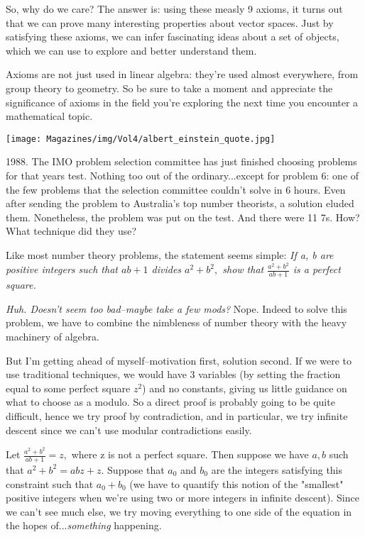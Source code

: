 \documentclass{article}
\begin{document}
\begin{multicols}{3}
So, why do we care? The answer is: using these measly 9 axioms, it turns out that we can prove many interesting properties about vector spaces. Just by satisfying these axioms, we can infer fascinating ideas about a set of objects, which we can use to explore and better understand them.

Axioms are not just used in linear algebra: they're used almost everywhere, from group theory to geometry. So be sure to take a moment and appreciate the significance of axioms in the field you're exploring the next time you encounter a mathematical topic.

\begin{center}
\texttt{[image: Magazines/img/Vol4/albert\_einstein\_quote.jpg]}
\end{center}
\closearticle

1988. The IMO problem selection committee has just finished choosing problems for that years test. Nothing too out of the ordinary...except for problem 6: one of the few problems that the selection committee couldn't solve in 6 hours. Even after sending the problem to Australia's top number theorists, a solution eluded them. Nonetheless, the problem was put on the test. And there were 11 7s. How? What technique did they use?

Like most number theory problems, the statement seems simple: \textit{If a, b are positive integers such that $ab+1 $ divides $a^2+b^2,$ show that $\frac{a^2+b^2}{ab+1}$ is a perfect square.} 

\textit{Huh. Doesn't seem too bad--maybe take a few mods?} Nope. Indeed to solve this problem, we have to combine the nimbleness of number theory with the heavy machinery of algebra. 

But I'm getting ahead of myself--motivation first, solution second. If we were to use traditional techniques, we would have 3 variables (by setting the fraction equal to some perfect square $z^2$) and no constants, giving us little guidance on what to choose as a modulo. So a direct proof is probably going to be quite difficult, hence we try proof by contradiction, and in particular, we try infinite descent since we can't use modular contradictions easily.

Let $\frac{a^2+b^2}{ab+1}=z,$ where z is not a perfect square. Then suppose we have $a,b$ such that $a^2+b^2=abz+z.$ Suppose that $a_0$ and $b_0$ are the integers satisfying this constraint such that $a_0+b_0$ (we have to quantify this notion of the "smallest" positive integers when we're using two or more integers in infinite descent). Since we can't see much else, we try moving everything to one side of the equation in the hopes of...\textit{something} happening.


\end{multicols}
\end{document}
